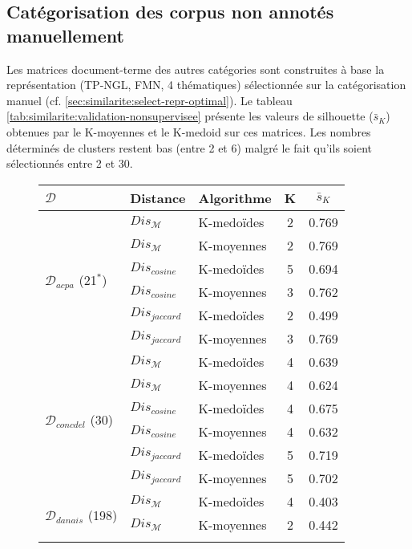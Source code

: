 \subsection{Catégorisation des corpus non annotés manuellement}
Les matrices document-terme des autres catégories sont construites à base la  représentation (TP-NGL, FMN,  4 thématiques) sélectionnée sur la catégorisation manuel (cf. \ref{sec:similarite:select-repr-optimal}). Le tableau \ref{tab:similarite:validation-nonsupervisee} présente les valeurs de silhouette ($\bar{s}_K$) obtenues par le K-moyennes et le K-medoid sur ces matrices. Les nombres déterminés de clusters restent bas (entre 2 et 6) malgré le fait qu'ils soient sélectionnés entre 2 et 30. 
\newlength{\mrcell}
\setlength{\mrcell}{0.8cm}
\begin{table}[!htb]
	\scriptsize
	\begin{subfigure}[ht]{0.49\textwidth}
	\begin{tabular}[pos]{|l|l|l|c|c|}
		\hline
		$\mathcal{D}$& \textbf{Distance} & \textbf{Algorithme}& \textbf{K}  & $\bar{s}_K$  \\ \hline
	\multirow{6}{\mrcell}{$\mathcal{D}_{acpa}$ (21$^*$)} & $Dis_\mathcal{M}$ & K-medoïdes & 2 & 0.769  \\ \cline{2-5}
	& $Dis_\mathcal{M}$ & K-moyennes & 2 & 0.769 \\ \cline{2-5}
	& $Dis_{cosine}$ & K-medoïdes & 5 & 0.694 \\ \cline{2-5}
	& $Dis_{cosine}$ & K-moyennes & 3 & 0.762  \\ \cline{2-5}
	& $Dis_{jaccard}$ & K-medoïdes & 2 & 0.499  \\ \cline{2-5}
	& $Dis_{jaccard}$ & K-moyennes & 3 & 0.769 \\ \hline
	\multirow{6}{\mrcell}{$\mathcal{D}_{concdel}$ (30)}  & $Dis_\mathcal{M}$ & K-medoïdes & 4 & 0.639  \\ \cline{2-5}
	& $Dis_\mathcal{M}$ & K-moyennes & 4 & 0.624  \\ \cline{2-5}
	& $Dis_{cosine}$ & K-medoïdes & 4 & 0.675  \\ \cline{2-5}
	& $Dis_{cosine}$ & K-moyennes & 4 & 0.632  \\ \cline{2-5}
	& $Dis_{jaccard}$ & K-medoïdes & 5 & 0.719  \\ \cline{2-5}
	& $Dis_{jaccard}$ & K-moyennes & 5 & 0.702\\ \hline
	\multirow{6}{\mrcell}{$\mathcal{D}_{danais}$ (198)} 
	& $Dis_\mathcal{M}$ & K-medoïdes & 4 & 0.403  \\ \cline{2-5}
	& $Dis_\mathcal{M}$ & K-moyennes & 2 & 0.442  \\ \cline{2-5}

\end{tabular}
\end{subfigure}
\end{table}
